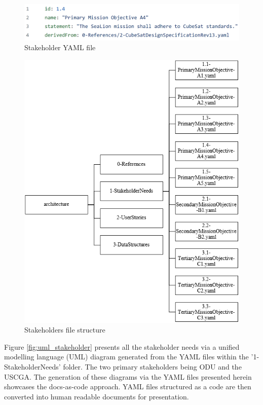 \documentclass[journal,article,submit,pdftex,moreauthors]{Definitions/mdpi}
\begin{document}
\begin{figure}[H]
    \includegraphics[width=13.75 cm]{assets/stakeholder.png}
    \caption{Stakeholder YAML file}
	\label{fig:stakeholder_yaml}
    \end{figure}   
\unskip

\begin{figure}[H]
    \includegraphics[width=10.5 cm]{assets/stakeholder_file.png}
    \caption{Stakeholders file structure}
	\label{fig:stakeholder_file}
    \end{figure}
	\noindent   
\unskip

Figure \ref{fig:uml_stakeholder} presents all the stakeholder needs via a unified modelling language (UML) diagram generated from the YAML files within the '1-StakeholderNeeds' folder.  The two primary stakeholders being ODU and the USCGA.  The generation of these diagrams via the YAML files presented herein showcases the docs-as-code approach.  YAML files structured as a code are then converted into human readable documents for presentation.
\end{document}

